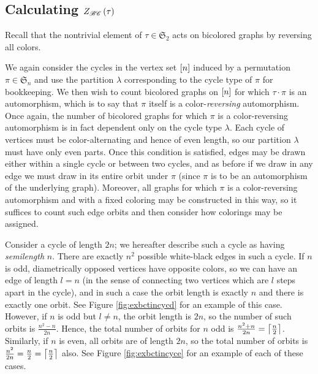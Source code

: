 \documentclass[sectionflow,singlespace,twoside,boldmathhdr]{brandiss} %
\numberwithin{section}{chapter}
\numberwithin{figure}{chapter}
\begin{document}
\subsection{Calculating $Z_{\mathscr{BC}} \left( {\tau} \right)$}\label{ss:tcibc}
Recall that the nontrivial element of $\tau \in \mathfrak{S}_{2}$ acts on bicolored graphs by reversing all colors.

We again consider the cycles in the vertex set $\left[ {n} \right]$ induced by a permutation $\pi \in \mathfrak{S}_{n}$ and use the partition $\lambda$ corresponding to the cycle type of $\pi$ for bookkeeping.
We then wish to count bicolored graphs on $\left[ {n} \right]$ for which $\tau \cdot \pi$ is an automorphism, which is to say that $\pi$ itself is a color-\emph{reversing} automorphism.
Once again, the number of bicolored graphs for which $\pi$ is a color-reversing automorphism is in fact dependent only on the cycle type $\lambda$.
Each cycle of vertices must be color-alternating and hence of even length, so our partition $\lambda$ must have only even parts.
Once this condition is satisfied, edges may be drawn either within a single cycle or between two cycles, and as before if we draw in any edge we must draw in its entire orbit under $\pi$ (since $\pi$ is to be an automorphism of the underlying graph).
Moreover, all graphs for which $\pi$ is a color-reversing automorphism and with a fixed coloring may be constructed in this way, so it suffices to count such edge orbits and then consider how colorings may be assigned.

Consider a cycle of length $2n$; we hereafter describe such a cycle as having \emph{semilength} $n$.
There are exactly $n^{2}$ possible white-black edges in such a cycle.
If $n$ is odd, diametrically opposed vertices have opposite colors, so we can have an edge of length $l = n$ (in the sense of connecting two vertices which are $l$ steps apart in the cycle), and in such a case the orbit length is exactly $n$ and there is exactly one orbit.
See Figure \ref{fig:exbctincycd} for an example of this case.
However, if $n$ is odd but $l \neq n$, the orbit length is $2n$, so the number of such orbits is $\frac{n^{2} - n}{2n}$.
Hence, the total number of orbits for $n$ odd is $\frac{n^2 + n}{2n} = \left\lceil {\frac{n}{2}} \right\rceil$.
Similarly, if $n$ is even, all orbits are of length $2n$, so the total number of orbits is $\frac{n^{2}}{2n} = \frac{n}{2} = \left\lceil {\frac{n}{2}} \right\rceil$ also.
See Figure \ref{fig:exbctincyce} for an example of each of these cases.
\end{document}
